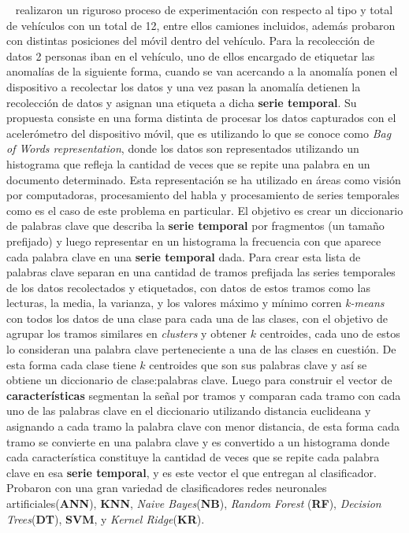 		~ realizaron un riguroso proceso de experimentación con respecto al tipo y total de vehículos con
		un total de 12, entre ellos camiones incluidos, además probaron con distintas posiciones del móvil dentro del vehículo. Para la recolección de datos 2
		personas iban en el vehículo, uno de ellos encargado de etiquetar las anomalías de la siguiente forma, cuando se van acercando a la anomalía ponen el
		dispositivo a recolectar los datos y una vez pasan la anomalía detienen la recolección de datos y asignan una etiqueta a dicha \textbf{serie temporal}. Su
		propuesta consiste en una forma distinta de procesar los datos capturados con el acelerómetro del dispositivo móvil, que es utilizando lo que se conoce
		como \emph{Bag of Words representation}, donde los datos son representados utilizando un histograma que refleja la cantidad de veces que se repite una
		palabra en un documento determinado. Esta representación se ha utilizado en áreas como visión por computadoras, procesamiento del habla y procesamiento
		de series temporales como es el caso de este problema en particular. El objetivo es crear un diccionario de palabras clave que describa la \textbf{serie temporal}
		por fragmentos (un tamaño prefijado) y luego representar en un histograma la frecuencia con que aparece cada palabra clave en una \textbf{serie temporal} dada.
		Para crear esta lista de palabras clave separan en una cantidad de tramos prefijada las series temporales de los datos recolectados y etiquetados, con
		datos de estos tramos como las lecturas, la media, la varianza, y los valores máximo y mínimo corren \emph{k-means} con todos los datos de una clase para
		cada una de las clases, con el objetivo de agrupar los tramos similares en \emph{clusters} y obtener $k$ centroides, cada uno de estos lo consideran una
		palabra clave perteneciente a una de las clases en cuestión. De esta forma cada clase tiene $k$ centroides que son sus palabras clave y así se obtiene 
		un diccionario de clase:palabras clave. Luego para construir el vector de \textbf{características} segmentan la señal por tramos y comparan cada tramo con cada
		uno de las palabras clave en el diccionario utilizando distancia euclideana y asignando a cada tramo la palabra clave con menor distancia, de esta forma
		cada tramo se convierte en una palabra clave y es convertido a un histograma donde cada característica constituye la cantidad de veces que se repite cada
		palabra clave en esa \textbf{serie temporal}, y es este vector el que entregan al clasificador. Probaron con una gran variedad de clasificadores redes neuronales
		artificiales(\textbf{ANN}), \textbf{KNN}, \emph{Naive Bayes}(\textbf{NB}), \emph{Random Forest} (\textbf{RF}), \emph{Decision Trees}(\textbf{DT}),
		\textbf{SVM}, y \emph{Kernel Ridge}(\textbf{KR}).\\
